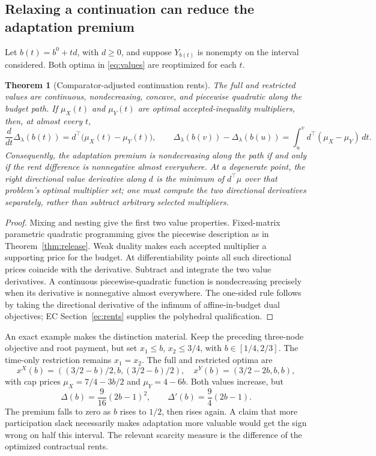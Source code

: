 \documentclass[11pt,letterpaper]{article}
\newtheorem{theorem}{Theorem}[section]
\theoremstyle{definition}\newtheorem{assumption}[theorem]{Assumption}
\begin{document}
\subsection{Relaxing a continuation can reduce the adaptation premium}
Let $b(t)=b^0+td$, with $d\geq0$, and suppose $Y_{b(t)}$ is nonempty on the interval considered. Both optima in \eqref{eq:values} are reoptimized for each $t$.
\begin{theorem}[Comparator-adjusted continuation rents]\label{thm:rents}
The full and restricted values are continuous, nondecreasing, concave, and piecewise quadratic along the budget path. If $\mu_X(t)$ and $\mu_Y(t)$ are optimal accepted-inequality multipliers, then, at almost every $t$,
\begin{equation}\label{eq:rent-difference}
 \frac{d}{dt}\Delta_\lambda(b(t))
 =d^\top\bigl(\mu_X(t)-\mu_Y(t)\bigr),\qquad
 \Delta_\lambda(b(v))-\Delta_\lambda(b(u))
 =\int_u^v d^\top(\mu_X-\mu_Y)\,dt.
\end{equation}
Consequently, the adaptation premium is nondecreasing along the path if and only if the rent difference is nonnegative almost everywhere. At a degenerate point, the right directional value derivative along $d$ is the minimum of $d^\top\mu$ over that problem's optimal multiplier set; one must compute the two directional derivatives separately, rather than subtract arbitrary selected multipliers.
\end{theorem}
\begin{proof}
Mixing and nesting give the first two value properties. Fixed-matrix parametric quadratic programming gives the piecewise description as in Theorem~\ref{thm:release}. Weak duality makes each accepted multiplier a supporting price for the budget. At differentiability points all such directional prices coincide with the derivative. Subtract and integrate the two value derivatives. A continuous piecewise-quadratic function is nondecreasing precisely when its derivative is nonnegative almost everywhere. The one-sided rule follows by taking the directional derivative of the infimum of affine-in-budget dual objectives; EC Section~\ref{ec:rents} supplies the polyhedral qualification.\end{proof}

An exact example makes the distinction material. Keep the preceding three-node objective and root payment, but set $x_1\leq b$, $x_2\leq3/4$, with $b\in[1/4,2/3]$. The time-only restriction remains $x_1=x_2$. The full and restricted optima are
\[
 x^X(b)=((3/2-b)/2,b,(3/2-b)/2),\quad
 x^Y(b)=(3/2-2b,b,b),
\]
with cap prices $\mu_X=7/4-3b/2$ and $\mu_Y=4-6b$. Both values increase, but
\begin{equation}\label{eq:u-shape}
 \Delta(b)=\frac9{16}(2b-1)^2,\qquad
 \Delta'(b)=\frac94(2b-1).
\end{equation}
The premium falls to zero as $b$ rises to $1/2$, then rises again. A claim that more participation slack necessarily makes adaptation more valuable would get the sign wrong on half this interval. The relevant scarcity measure is the difference of the optimized contractual rents.
\end{document}
